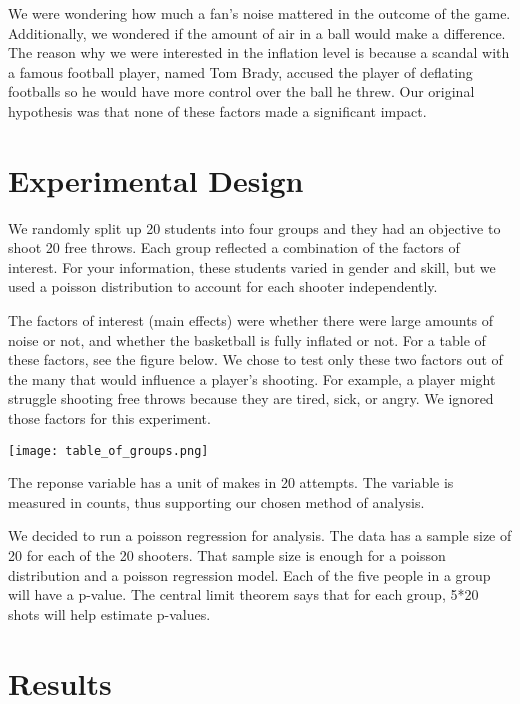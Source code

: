 \documentclass[12pt]{article}\usepackage[]{graphicx}\usepackage[]{color}
\begin{document}
We were wondering how much a fan's noise mattered in the outcome of the game. Additionally, we wondered if the amount of air in a ball would make a difference. The reason why we were interested in the inflation level is because a scandal with a famous football player, named Tom Brady, accused the player of deflating footballs so he would have more control over the ball he threw. Our original hypothesis was that none of these factors made a significant impact. 

\section{Experimental Design}

We randomly split up 20 students into four groups and they had an objective to shoot 20 free throws. Each group reflected a combination of the factors of interest. For your information, these students varied in gender and skill, but we used a poisson distribution to account for each shooter independently.

The factors of interest (main effects) were whether there were large amounts of noise or not, and whether the basketball is fully inflated or not. For a table of these factors, see the figure below. We chose to test only these two factors out of the many that would influence a player's shooting. For example, a player might struggle shooting free throws because they are tired, sick, or angry. We ignored those factors for this experiment. 

\texttt{[image: table\_of\_groups.png]}

The reponse variable has a unit of makes in 20 attempts. The variable is measured in counts, thus supporting our chosen method of analysis. 

We decided to run a poisson regression for analysis. The data has a sample size of 20 for each of the 20 shooters. That sample size is enough for a poisson distribution and a poisson regression model. Each of the five people in a group will have a p-value. The central limit theorem says that for each group, 5*20 shots will help estimate p-values. 

\section{Results}

\end{document}
